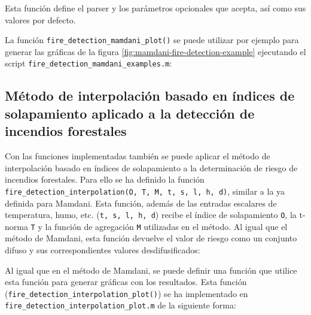 

Esta función define el parser y los parámetros opcionales que acepta, así como sus valores por defecto. 

La función \lstinline|fire_detection_mamdani_plot()| se puede utilizar por ejemplo para generar las gráficas de la figura \ref{fig:mamdani-fire-detection-example} ejecutando el script \lstinline|fire_detection_mamdani_examples.m|:



\subsection{Método de interpolación basado en índices de solapamiento aplicado a la detección de incendios forestales}
Con las funciones implementadas también se puede aplicar el método de interpolación basado en índices de solapamiento a la determinación de riesgo de incendios forestales. Para ello se ha definido la función \lstinline|fire_detection_interpolation(O, T, M, t, s, l, h, d)|, similar a la ya definida para Mamdani. Esta función, además de las entradas escalares de temperatura, humo, etc. (\lstinline|t, s, l, h, d|) recibe el índice de solapamiento \lstinline|O|, la t-norma \lstinline|T| y la función de agregación \lstinline|M| utilizadas en el método. Al igual que el método de Mamdani, esta función devuelve el valor de riesgo como un conjunto difuso y sus correspondientes valores desdifusificados:



Al igual que en el método de Mamdani, se puede definir una función que utilice esta función para generar gráficas con los resultados. Esta función (\lstinline|fire_detection_interpolation_plot()|) se ha implementado en \lstinline|fire_detection_interpolation_plot.m| de la siguiente forma:



